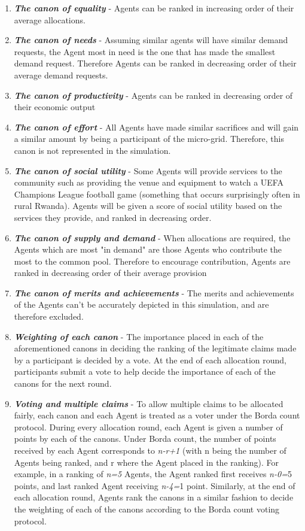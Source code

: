 \begin{enumerate}
	\item \textbf{\textit{The canon of equality}} - Agents can be ranked in increasing order of their average allocations.
	\item \textbf{\textit{The canon of needs}} - Assuming similar agents will have similar demand requests, the Agent most in need is the one that has made the smallest demand request. Therefore Agents can be ranked in decreasing order of their average demand requests.
	\item \textbf{\textit{The canon of productivity}} - Agents can be ranked in decreasing order of their economic output
	\item \textbf{\textit{The canon of effort}} - All Agents have made similar sacrifices and will gain a similar amount by being a participant of the micro-grid. Therefore, this canon is not represented in the simulation.
	\item \textbf{\textit{The canon of social utility}} - Some Agents will provide services to the community such as providing the venue and equipment to watch a UEFA Champions League football game (something that occurs surprisingly often in rural Rwanda). Agents will be given a score of social utility based on the services they provide, and ranked in decreasing order.
	\item \textbf{\textit{The canon of supply and demand}} - When allocations are required, the Agents which are most "in demand" are those Agents who contribute the most to the common pool. Therefore to encourage contribution, Agents are ranked in decreasing order of their average provision
	\item \textbf{\textit{The canon of merits and achievements}} - The merits and achievements of the Agents can't be accurately depicted in this simulation, and are therefore excluded.
	\item \textbf{\textit{Weighting of each canon}} - The importance placed in each of the aforementioned canons in deciding the ranking of the legitimate claims made by a participant is decided by a vote. At the end of each allocation round, participants submit a vote to help decide the importance of each of the canons for the next round.
	\item \textbf{\textit{Voting and multiple claims}} - To allow multiple claims to be allocated fairly, each canon and each Agent is treated as a voter under the Borda count protocol. During every allocation round, each Agent is given a number of points by each of the canons. Under Borda count, the number of points received by each Agent corresponds to \textit{n-r+1} (with n being the number of Agents being ranked, and r where the Agent placed in the ranking). For example, in a ranking of \textit{n=5} Agents, the Agent ranked first receives \textit{n-0=}5 points, and last ranked Agent receiving \textit{n-4=}1 point. Similarly, at the end of each allocation round, Agents rank the canons in a similar fashion to decide the weighting of each of the canons according to the Borda count voting protocol.
\end{enumerate}


